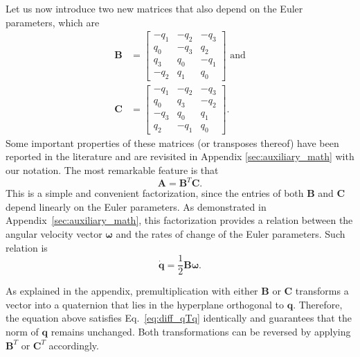 \documentclass[aip,jcp,reprint,amsmath,amssymb]{revtex4-1}
\newcommand{\mt}[1]{\boldsymbol{\mathbf{#1}}}           %
\newcommand{\vt}[1]{\boldsymbol{\mathbf{#1}}}           %
\newcommand{\tr}[1]{#1^T}                               %
\begin{document}
Let us now introduce two new matrices that also depend on the Euler parameters, which are
\begin{subequations}
\label{eq:def_B_and_C}
\begin{align}
\mt B &= \left[
\begin{array}{rrrr}
-q_1 & -q_2 & -q_3 \\
 q_0 & -q_3 &  q_2 \\
 q_3 &  q_0 & -q_1 \\
-q_2 &  q_1 &  q_0
\end{array}
\right] \text{ and} \label{eq:def_B} \\
\mt C &= \left[
\begin{array}{rrrr}
-q_1 & -q_2 & -q_3 \\
 q_0 &  q_3 & -q_2 \\
-q_3 &  q_0 &  q_1 \\
 q_2 & -q_1 &  q_0
\end{array}
\right].
\end{align}
\end{subequations}
Some important properties of these matrices (or transposes thereof) have been reported in the literature\cite{Haug1989, Shuster1993, Dichmann1999, Ravishankar2004, Nielsen2012} and are revisited in Appendix \ref{sec:auxiliary_math} with our notation. The most remarkable feature is that
\begin{equation}
\label{eq:factorization_of_A}
{\mt A} = \tr{\mt B}{\mt C}.
\end{equation}
This is a simple and convenient factorization, since the entries of both $\mt B$ and $\mt C$ depend linearly on the Euler parameters. As demonstrated in Appendix~\ref{sec:auxiliary_math}, this factorization provides a relation between the angular velocity vector $\vt \omega$ and the rates of change of the Euler parameters. Such relation is
\begin{equation}
\label{eq:relation_qdot_omega}
\dot{\vt q} = \frac{1}{2} \mt B \vt \omega.
\end{equation}

As explained in the appendix, premultiplication with either $\mt B$ or $\mt C$ transforms a vector into a quaternion that lies in the hyperplane orthogonal to $\vt q$. Therefore, the equation above satisfies Eq.~\ref{eq:diff_qTq} identically and guarantees that the norm of $\vt q$ remains unchanged. Both transformations can be reversed by applying $\tr{\vt B}$ or $\tr{\vt C}$ accordingly.
\end{document}
